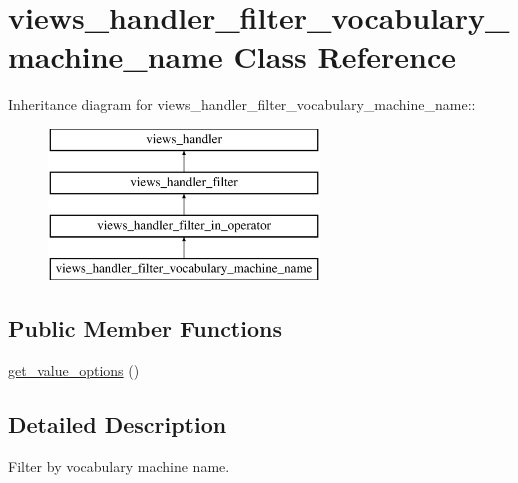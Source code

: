 \hypertarget{classviews__handler__filter__vocabulary__machine__name}{
\section{views\_\-handler\_\-filter\_\-vocabulary\_\-machine\_\-name Class Reference}
\label{classviews__handler__filter__vocabulary__machine__name}
}
Inheritance diagram for views\_\-handler\_\-filter\_\-vocabulary\_\-machine\_\-name::\begin{figure}[H]
\begin{center}
\leavevmode
\includegraphics[height=4cm]{classviews__handler__filter__vocabulary__machine__name}
\end{center}
\end{figure}
\subsection*{Public Member Functions}
\begin{DoxyCompactItemize}
\item 
\hyperlink{classviews__handler__filter__vocabulary__machine__name_a908ca2aa5491d15ab2e0e85cefe62dab}{get\_\-value\_\-options} ()
\end{DoxyCompactItemize}


\subsection{Detailed Description}
Filter by vocabulary machine name. 

